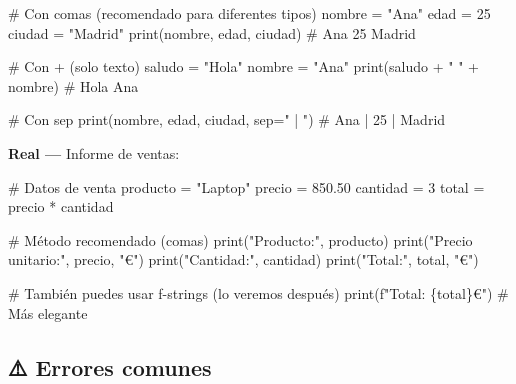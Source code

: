 \documentclass[
  doc,
  floatsintext,
  longtable,
  a4paper,
  nolmodern,
  notxfonts,
  notimes,
  12pt,
  colorlinks=true,linkcolor=blue,citecolor=blue,urlcolor=blue]{apa7}
\newenvironment{Shaded}{\begin{snugshade}}{\end{snugshade}}
\newcommand{\BuiltInTok}[1]{\textcolor[rgb]{0.00,0.23,0.31}{#1}}
\newcommand{\CommentTok}[1]{\textcolor[rgb]{0.37,0.37,0.37}{#1}}
\newcommand{\DecValTok}[1]{\textcolor[rgb]{0.68,0.00,0.00}{#1}}
\newcommand{\FloatTok}[1]{\textcolor[rgb]{0.68,0.00,0.00}{#1}}
\newcommand{\NormalTok}[1]{\textcolor[rgb]{0.00,0.23,0.31}{#1}}
\newcommand{\OperatorTok}[1]{\textcolor[rgb]{0.37,0.37,0.37}{#1}}
\newcommand{\SpecialCharTok}[1]{\textcolor[rgb]{0.37,0.37,0.37}{#1}}
\newcommand{\SpecialStringTok}[1]{\textcolor[rgb]{0.13,0.47,0.30}{#1}}
\newcommand{\StringTok}[1]{\textcolor[rgb]{0.13,0.47,0.30}{#1}}
\begin{document}
\begin{Shaded}
\begin{Highlighting}[]
\CommentTok{\# Con comas (recomendado para diferentes tipos)}
\NormalTok{nombre }\OperatorTok{=} \StringTok{"Ana"}
\NormalTok{edad }\OperatorTok{=} \DecValTok{25}
\NormalTok{ciudad }\OperatorTok{=} \StringTok{"Madrid"}
\BuiltInTok{print}\NormalTok{(nombre, edad, ciudad)  }\CommentTok{\# Ana 25 Madrid}

\CommentTok{\# Con + (solo texto)}
\NormalTok{saludo }\OperatorTok{=} \StringTok{"Hola"}
\NormalTok{nombre }\OperatorTok{=} \StringTok{"Ana"}
\BuiltInTok{print}\NormalTok{(saludo }\OperatorTok{+} \StringTok{" "} \OperatorTok{+}\NormalTok{ nombre)  }\CommentTok{\# Hola Ana}

\CommentTok{\# Con sep}
\BuiltInTok{print}\NormalTok{(nombre, edad, ciudad, sep}\OperatorTok{=}\StringTok{" | "}\NormalTok{)  }\CommentTok{\# Ana | 25 | Madrid}
\end{Highlighting}
\end{Shaded}

\textbf{Real ---} Informe de ventas:

\begin{Shaded}
\begin{Highlighting}[]
\CommentTok{\# Datos de venta}
\NormalTok{producto }\OperatorTok{=} \StringTok{"Laptop"}
\NormalTok{precio }\OperatorTok{=} \FloatTok{850.50}
\NormalTok{cantidad }\OperatorTok{=} \DecValTok{3}
\NormalTok{total }\OperatorTok{=}\NormalTok{ precio }\OperatorTok{*}\NormalTok{ cantidad}

\CommentTok{\# Método recomendado (comas)}
\BuiltInTok{print}\NormalTok{(}\StringTok{"Producto:"}\NormalTok{, producto)}
\BuiltInTok{print}\NormalTok{(}\StringTok{"Precio unitario:"}\NormalTok{, precio, }\StringTok{"€"}\NormalTok{)}
\BuiltInTok{print}\NormalTok{(}\StringTok{"Cantidad:"}\NormalTok{, cantidad)}
\BuiltInTok{print}\NormalTok{(}\StringTok{"Total:"}\NormalTok{, total, }\StringTok{"€"}\NormalTok{)}

\CommentTok{\# También puedes usar f{-}strings (lo veremos después)}
\BuiltInTok{print}\NormalTok{(}\SpecialStringTok{f"Total: }\SpecialCharTok{\{}\NormalTok{total}\SpecialCharTok{\}}\SpecialStringTok{€"}\NormalTok{)  }\CommentTok{\# Más elegante}
\end{Highlighting}
\end{Shaded}

\subsection{⚠️ Errores comunes}\label{errores-comunes}
\end{document}
